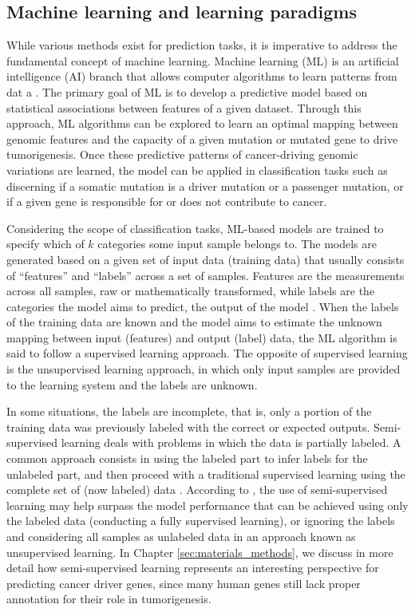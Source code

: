 \subsection{Machine learning and learning paradigms}


While various methods exist for prediction tasks, it is imperative to address the fundamental concept of machine learning. Machine learning (ML) is an artificial intelligence (AI) branch that allows computer algorithms to learn patterns from dat a \cite{el2015machine}. The primary goal of ML is to develop a predictive model based on statistical associations between features of a given dataset. Through this approach, ML algorithms can be explored to learn an optimal mapping between genomic features and the capacity of a given mutation or mutated gene to drive tumorigenesis. Once these predictive patterns of cancer-driving genomic variations are learned, the model can be applied in classification tasks such as discerning if a somatic mutation is a driver mutation or a passenger mutation, or if a given gene is responsible for or does not contribute to cancer. 

Considering the scope of classification tasks, ML-based models are trained to specify which of $k$ categories some input sample belongs to. The models are generated based on a given set of input data (\ie training data) that usually consists of ``features'' and ``labels'' across a set of samples. Features are the measurements across all samples, raw or mathematically transformed, while labels are the categories the model aims to predict, \ie the output of the model \cite{Camacho2018}. When the labels of the training data are known and the model aims to estimate the unknown mapping between input (\ie features) and output (\ie label) data, the ML algorithm is said to follow a supervised learning approach. The opposite of supervised learning is the unsupervised learning approach, in which only input samples are provided to the learning system and the labels are unknown.

In some situations, the labels are incomplete, that is, only a portion of the training data was previously labeled with the correct or expected outputs. Semi-supervised learning deals with problems in which the data is partially labeled. A common approach consists in using the labeled part to infer labels for the unlabeled part, and then proceed with a traditional supervised learning using the complete set of (now labeled) data \cite{el2015machine}. According to \citet{Camacho2018}, the use of semi-supervised learning may help surpass the model performance that can be achieved using only the labeled data (conducting a fully supervised learning), or ignoring the labels and considering all samples as unlabeled data in an approach known as unsupervised learning. In Chapter \ref{sec:materials_methods}, we discuss in more detail how semi-supervised learning represents an interesting perspective for predicting cancer driver genes, since many human genes still lack proper annotation for their role in tumorigenesis.

